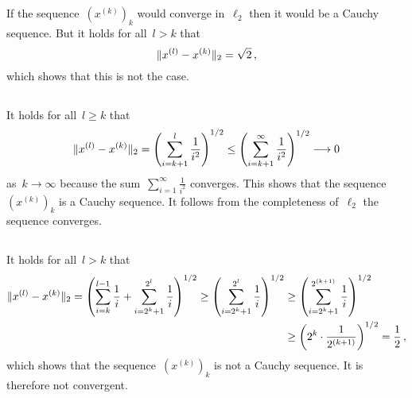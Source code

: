 \section{}





\subsection{}

If the sequence~$(x^{(k)})_k$ would converge in~$\ell_2$ then it would be a Cauchy sequence.
But it holds for all~$l > k$ that
\[
    \lVert x^{(l)} - x^{(k)} \rVert_2
  = \sqrt{2} \,,
\]
which shows that this is not the case.





\subsection{}

It holds for all~$l \geq k$ that
\[
          \lVert x^{(l)} - x^{(k)} \rVert_2
  =       \left( \sum_{i=k+1}^l \frac{1}{i^2} \right)^{1/2}
  \leq    \left( \sum_{i=k+1}^\infty \frac{1}{i^2} \right)^{1/2}
  \longrightarrow 0
\]
as~$k \to \infty$ because the sum~$\sum_{i=1}^\infty \frac{1}{i^2}$ converges.
This shows that the sequence~$(x^{(k)})_k$ is a Cauchy sequence.
It follows from the completeness of~$\ell_2$ the sequence converges.





\subsection{}

It holds for all~$l > k$ that
\begin{align*}
        \lVert x^{(l)} - x^{(k)} \rVert_2
   =    \left( \sum_{i=k}^{l-1} \frac{1}{i} + \sum_{i=2^k+1}^{2^l} \frac{1}{i} \right)^{1/2}
   \geq \left( \sum_{i=2^k+1}^{2^l} \frac{1}{i} \right)^{1/2}
  &\geq \left( \sum_{i=2^k+1}^{2^{(k+1)}} \frac{1}{i} \right)^{1/2} \\
  &\geq \left( 2^k \cdot \frac{1}{2^{(k+1)}} \right)^{1/2}
   =    \frac{1}{2} \,,
\end{align*}
which shows that the sequence~$(x^{(k)})_k$ is not a Cauchy sequence.
It is therefore not convergent.




